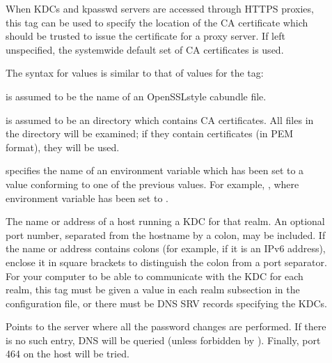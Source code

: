 \documentclass[letterpaper,10pt,english]{sphinxmanual}
\begin{document}
\begin{description}
\item[{}] \leavevmode
\sphinxAtStartPar
When KDCs and kpasswd servers are accessed through HTTPS proxies, this tag
can be used to specify the location of the CA certificate which should be
trusted to issue the certificate for a proxy server.  If left unspecified,
the system\sphinxhyphen{}wide default set of CA certificates is used.

\sphinxAtStartPar
The syntax for values is similar to that of values for the
 tag:

\sphinxAtStartPar
{} 

\sphinxAtStartPar
{} is assumed to be the name of an OpenSSL\sphinxhyphen{}style ca\sphinxhyphen{}bundle file.

\sphinxAtStartPar
{} 

\sphinxAtStartPar
{} is assumed to be an directory which contains CA certificates.
All files in the directory will be examined; if they contain certificates
(in PEM format), they will be used.

\sphinxAtStartPar
{} 

\sphinxAtStartPar
{} specifies the name of an environment variable which has been set
to a value conforming to one of the previous values.  For example,
, where environment variable  has
been set to .

\item[{}] \leavevmode
\sphinxAtStartPar
The name or address of a host running a KDC for that realm.  An
optional port number, separated from the hostname by a colon, may
be included.  If the name or address contains colons (for example,
if it is an IPv6 address), enclose it in square brackets to
distinguish the colon from a port separator.  For your computer to
be able to communicate with the KDC for each realm, this tag must
be given a value in each realm subsection in the configuration
file, or there must be DNS SRV records specifying the KDCs.

\item[{}] \leavevmode
\sphinxAtStartPar
Points to the server where all the password changes are performed.
If there is no such entry, DNS will be queried (unless forbidden
by ).  Finally, port 464 on the 
host will be tried.


\end{description}
\end{document}
